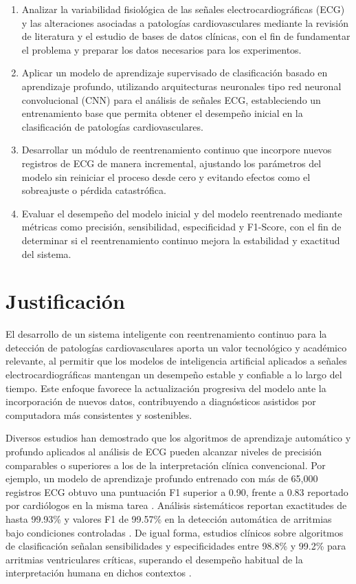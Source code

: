 \begin{enumerate}
\item Analizar la variabilidad fisiológica de las señales electrocardiográficas (ECG) y las alteraciones asociadas a patologías cardiovasculares mediante la revisión de literatura y el estudio de bases de datos clínicas, con el fin de fundamentar el problema y preparar los datos necesarios para los experimentos.

\item Aplicar un modelo de aprendizaje supervisado de clasificación basado en aprendizaje profundo, utilizando arquitecturas neuronales tipo red neuronal convolucional (CNN) para el análisis de señales ECG, estableciendo un entrenamiento base que permita obtener el desempeño inicial en la clasificación de patologías cardiovasculares.

\item Desarrollar un módulo de reentrenamiento continuo que incorpore nuevos registros de ECG de manera incremental, ajustando los parámetros del modelo sin reiniciar el proceso desde cero y evitando efectos como el sobreajuste o pérdida catastrófica.

\item Evaluar el desempeño del modelo inicial y del modelo reentrenado mediante métricas como precisión, sensibilidad, especificidad y F1-Score, con el fin de determinar si el reentrenamiento continuo mejora la estabilidad y exactitud del sistema.
\end{enumerate}

\section{Justificación}

El desarrollo de un sistema inteligente con reentrenamiento continuo para la detección de patologías cardiovasculares aporta un valor tecnológico y académico relevante, al permitir que los modelos de inteligencia artificial aplicados a señales electrocardiográficas mantengan un desempeño estable y confiable a lo largo del tiempo. Este enfoque favorece la actualización progresiva del modelo ante la incorporación de nuevos datos, contribuyendo a diagnósticos asistidos por computadora más consistentes y sostenibles.

Diversos estudios han demostrado que los algoritmos de aprendizaje automático y profundo aplicados al análisis de ECG pueden alcanzar niveles de precisión comparables o superiores a los de la interpretación clínica convencional. Por ejemplo, un modelo de aprendizaje profundo entrenado con más de 65,000 registros ECG obtuvo una puntuación F1 superior a 0.90, frente a 0.83 reportado por cardiólogos en la misma tarea \cite{Chang2019}. Análisis sistemáticos reportan exactitudes de hasta 99.93\% y valores F1 de 99.57\% en la detección automática de arritmias bajo condiciones controladas \cite{Reshad2025}. De igual forma, estudios clínicos sobre algoritmos de clasificación señalan sensibilidades y especificidades entre 98.8\% y 99.2\% para arritmias ventriculares críticas, superando el desempeño habitual de la interpretación humana en dichos contextos \cite{ESC2023}.


